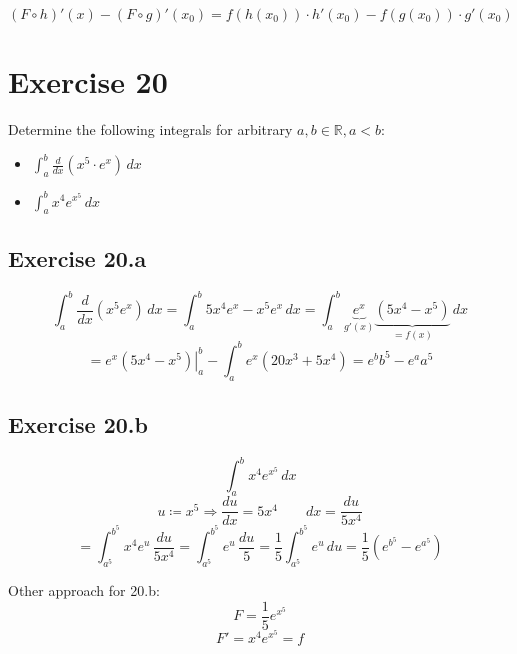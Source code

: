 \documentclass[a4paper]{article}
\theoremstyle{definition}
\begin{document}
\[
  (F \circ h)' (x) - (F \circ g)'(x_0)
  = f(h(x_0)) \cdot h'(x_0) - f(g(x_0)) \cdot g'(x_0)
\]

\section{Exercise 20}
\begin{ex}
  Determine the following integrals for arbitrary $a,b \in \mathbb R, a < b$:
  \begin{itemize}
    \item $\int_a^b \frac{d}{dx} \left(x^5 \cdot e^x\right) \, dx$
    \item $\int_a^b x^4 e^{x^5} \, dx$
  \end{itemize}
\end{ex}

\subsection{Exercise 20.a}
\[
  \int_a^b \frac{d}{dx} \left(x^5 e^{x}\right) \, dx
  = \int_a^b 5x^4 e^x - x^5 e^x \, dx
  = \int_a^b \underbrace{e^x}_{g'(x)} \underbrace{(5 x^4 - x^5)}_{= f(x)} \, dx
\] \[
  = \left.e^x (5x^4 - x^5) \right|_a^b - \int_a^b e^x (20 x^3 + 5x^4)
  = e^b b^5 - e^a a^5
\]

\subsection{Exercise 20.b}
\[
  \int_a^b x^4 e^{x^5} \, dx
\] \[
  u \coloneqq x^5 \Rightarrow \frac{du}{dx} = 5x^4 \qquad dx = \frac{du}{5x^4}
\] \[
  = \int_{a^5}^{b^5} x^4 e^u \, \frac{du}{5x^4}
  = \int_{a^5}^{b^5} e^u \, \frac{du}{5}
  = \frac15 \int_{a^5}^{b^5} e^u \, du
  = \frac15 \left(e^{b^5} - e^{a^5}\right)
\]

Other approach for 20.b:
\[ F = \frac15 e^{x^5} \]
\[ F' = x^4 e^{x^5} = f \]
\end{document}
